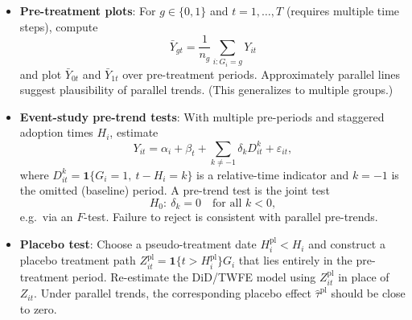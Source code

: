 \documentclass[11pt]{exam}
\begin{document}
\begin{itemize}
  \item \textbf{Pre-treatment plots}: For $g \in \{0,1\}$ and $t=1,\dots,T$
  (requires multiple time steps), compute
  \[
    \bar Y_{gt}
    = \frac{1}{n_g} \sum_{i: G_i = g} Y_{it}
  \]
  and plot $\bar Y_{0t}$ and $\bar Y_{1t}$ over pre-treatment periods.
  Approximately parallel lines suggest plausibility of parallel trends.
  (This generalizes to multiple groups.)

  \item \textbf{Event-study pre-trend tests}: With multiple pre-periods and
  staggered adoption times $H_i$, estimate
  \[
    Y_{it}
    = \alpha_i + \beta_t
      + \sum_{k \neq -1} \delta_k D_{it}^k
      + \varepsilon_{it},
  \]
  where $D_{it}^k = \mathbf{1}\{G_i = 1,\ t - H_i = k\}$ is a relative-time
  indicator and $k=-1$ is the omitted (baseline) period. A pre-trend test is
  the joint test
  \[
    H_0: \ \delta_k = 0 \quad \text{for all } k < 0,
  \]
  e.g.\ via an $F$-test. Failure to reject is consistent with parallel
  pre-trends.

  \item \textbf{Placebo test}: Choose a pseudo-treatment date
  $H_i^{\mathrm{pl}} < H_i$ and construct a placebo treatment path $Z_{it}^{\mathrm{pl}}
    = \mathbf{1}\{t > H_i^{\mathrm{pl}}\} G_i$
  that lies entirely in the pre-treatment period. Re-estimate the DiD/TWFE
  model using $Z_{it}^{\mathrm{pl}}$ in place of $Z_{it}$. Under parallel
  trends, the corresponding placebo effect $\hat\tau^{\mathrm{pl}}$ should be
  close to zero.
\end{itemize}
\end{document}
